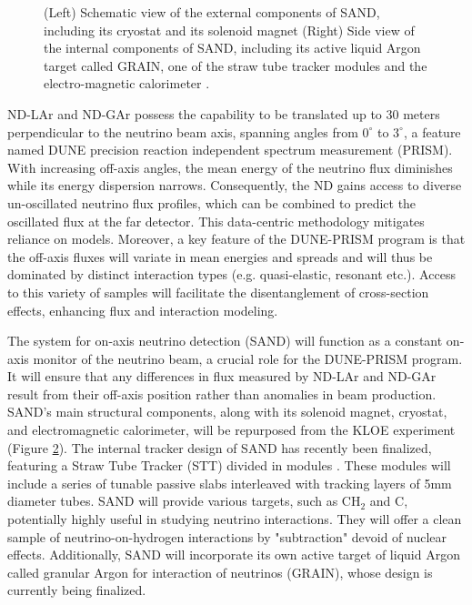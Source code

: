 \begin{figure}[t]
\begin{subfigure}[b]{0.48\textwidth}
         \caption{}
         \label{fig:SAND-inside}
     \end{subfigure}
        \caption[Schematic view of SAND.]{(Left) Schematic view of the external components of SAND, including its cryostat and its solenoid magnet (Right) Side view of the internal components of SAND, including its active liquid Argon target called GRAIN, one of the straw tube tracker modules and the electro-magnetic calorimeter \cite{Battisti:2022ND}.  }
        \label{fig:SAND-all}
\end{figure}

ND-LAr and ND-GAr possess the capability to be translated up to 30 meters perpendicular to the neutrino beam axis, spanning angles from $0^{\circ}$ to $3^{\circ}$, a feature named DUNE precision reaction independent spectrum measurement (PRISM). With increasing off-axis angles, the mean energy of the neutrino flux diminishes while its energy dispersion narrows. Consequently, the ND gains access to diverse un-oscillated neutrino flux profiles, which can be combined to predict the oscillated flux at the far detector. This data-centric methodology mitigates reliance on models. Moreover, a key feature of the DUNE-PRISM program is that the off-axis fluxes will variate in mean energies and spreads and will thus be dominated by distinct interaction types (e.g. quasi-elastic, resonant etc.). Access to this variety of samples will facilitate the disentanglement of cross-section effects, enhancing flux and interaction modeling.

The system for on-axis neutrino detection (SAND) will function as a constant on-axis monitor of the neutrino beam, a crucial role for the DUNE-PRISM program. It will ensure that any differences in flux measured by ND-LAr and ND-GAr result from their off-axis position rather than anomalies in beam production. SAND's main structural components, along with its solenoid magnet, cryostat, and electromagnetic calorimeter, will be repurposed from the KLOE experiment (Figure \ref{fig:SAND-all}). The internal tracker design of SAND has recently been finalized, featuring a Straw Tube Tracker (STT) divided in modules \cite{Battisti:2022ND}. These modules will include a series of tunable passive slabs interleaved with tracking layers of 5mm diameter tubes. SAND will provide various targets, such as CH$_2$ and C, potentially highly useful in studying neutrino interactions. They will offer a clean sample of neutrino-on-hydrogen interactions by "subtraction" devoid of nuclear effects. Additionally, SAND will incorporate its own active target of liquid Argon called granular Argon for interaction of neutrinos (GRAIN), whose design is currently being finalized. 

